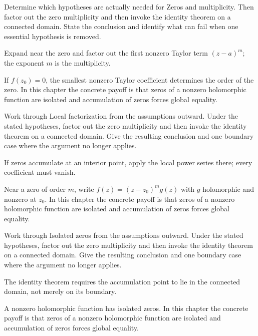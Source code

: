 \begin{exercise}\label{exr:iv07-01}
Determine which hypotheses are actually needed for Zeros and multiplicity. Then factor out the zero multiplicity and then invoke the identity theorem on a connected domain. State the conclusion and identify what can fail when one essential hypothesis is removed.
\end{exercise}
\begin{hint}
Expand near the zero and factor out the first nonzero Taylor term \((z-a)^m\); the exponent \(m\) is the multiplicity.
\end{hint}
\begin{solution}
If $f(z_0)=0$, the smallest nonzero Taylor coefficient determines the order of the zero. In this chapter the concrete payoff is that zeros of a nonzero holomorphic function are isolated and accumulation of zeros forces global equality.
\end{solution}

\begin{exercise}\label{exr:iv07-02}
Work through Local factorization from the assumptions outward. Under the stated hypotheses, factor out the zero multiplicity and then invoke the identity theorem on a connected domain. Give the resulting conclusion and one boundary case where the argument no longer applies.
\end{exercise}
\begin{hint}
If zeros accumulate at an interior point, apply the local power series there; every coefficient must vanish.
\end{hint}
\begin{solution}
Near a zero of order $m$, write $f(z)=(z-z_0)^mg(z)$ with $g$ holomorphic and nonzero at $z_0$. In this chapter the concrete payoff is that zeros of a nonzero holomorphic function are isolated and accumulation of zeros forces global equality.
\end{solution}

\begin{exercise}\label{exr:iv07-03}
Work through Isolated zeros from the assumptions outward. Under the stated hypotheses, factor out the zero multiplicity and then invoke the identity theorem on a connected domain. Give the resulting conclusion and one boundary case where the argument no longer applies.
\end{exercise}
\begin{hint}
The identity theorem requires the accumulation point to lie in the connected domain, not merely on its boundary.
\end{hint}
\begin{solution}
A nonzero holomorphic function has isolated zeros. In this chapter the concrete payoff is that zeros of a nonzero holomorphic function are isolated and accumulation of zeros forces global equality.
\end{solution}

